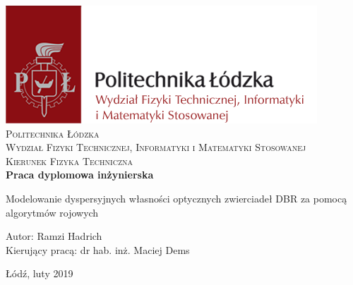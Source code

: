 
\newpage
\thispagestyle{empty}





\begin{onehalfspacing}
\begin{center}

\centering
\includegraphics[keepaspectratio,scale=0.5]{./figures/logo.png} \\[.8cm]


{\fontsize{17}{17}\selectfont
\textsc{Politechnika Łódzka \\[.3cm]
Wydział Fizyki Technicznej, Informatyki i Matematyki Stosowanej  \\[.3cm]
Kierunek Fizyka Techniczna  \\[2.5cm]}
\textbf{Praca dyplomowa inżynierska\\[1.7cm]}}



\large 
{Modelowanie dyspersyjnych własności optycznych zwierciadeł DBR za pomocą algorytmów rojowych} \\[2.3cm]


\large
\begin{flushleft}
Autor: Ramzi Hadrich  \\
Kierujący pracą:  dr hab. inż. Maciej Dems \\
\end{flushleft}

\vspace{3cm}
Łódź, luty 2019
\end{center}
\end{onehalfspacing}

